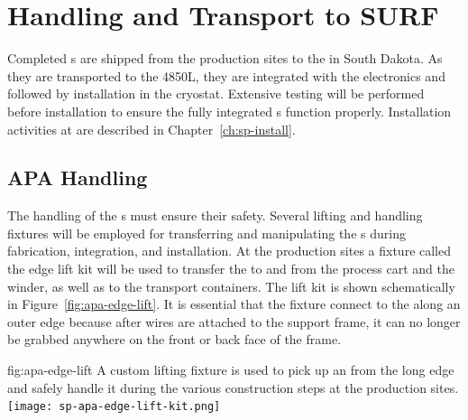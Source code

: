 \section{Handling and Transport to SURF} %
\label{sec:fdsp-apa-transport}

Completed s are shipped from the  production sites to 
the  in South Dakota. As they are transported to the 4850L, they are integrated %
with the   electronics and  followed by installation in the cryostat. %
Extensive  testing will be performed before installation to ensure the fully integrated s function properly.  %
Installation activities at  are described in Chapter~\ref{ch:sp-install}. 

\subsection{APA Handling}
\label{sec:fdsp-apa-transport-handling}

The handling of the s  must %
ensure their safety.  Several lifting and handling fixtures will be employed for transferring and manipulating the s during fabrication, integration, and installation.  At the production sites a fixture called the edge lift kit will be used to transfer the  to and from the process cart and the winder, as well as to the transport containers.  The lift kit is shown schematically in Figure~\ref{fig:apa-edge-lift}.  It is essential that the fixture connect to the  along an outer edge because after wires are attached to the support frame, it can no longer be grabbed anywhere on the front or back face of the frame. 

\begin{dunefigure}{fig:apa-edge-lift}
{A custom lifting fixture is used to pick up an  from the long edge and safely handle it during the various construction steps at the production sites.}  
\texttt{[image: sp-apa-edge-lift-kit.png]} 
\end{dunefigure}

